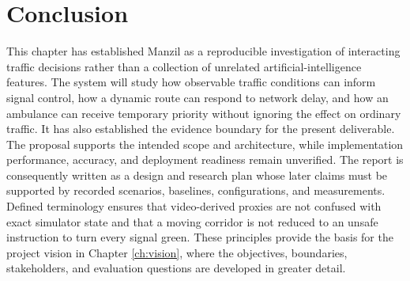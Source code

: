 \section{Conclusion}

This chapter has established Manzil as a reproducible investigation of interacting traffic decisions rather than a collection of unrelated artificial-intelligence features. The system will study how observable traffic conditions can inform signal control, how a dynamic route can respond to network delay, and how an ambulance can receive temporary priority without ignoring the effect on ordinary traffic. It has also established the evidence boundary for the present deliverable. The proposal supports the intended scope and architecture, while implementation performance, accuracy, and deployment readiness remain unverified. The report is consequently written as a design and research plan whose later claims must be supported by recorded scenarios, baselines, configurations, and measurements. Defined terminology ensures that video-derived proxies are not confused with exact simulator state and that a moving corridor is not reduced to an unsafe instruction to turn every signal green. These principles provide the basis for the project vision in Chapter \ref{ch:vision}, where the objectives, boundaries, stakeholders, and evaluation questions are developed in greater detail.
